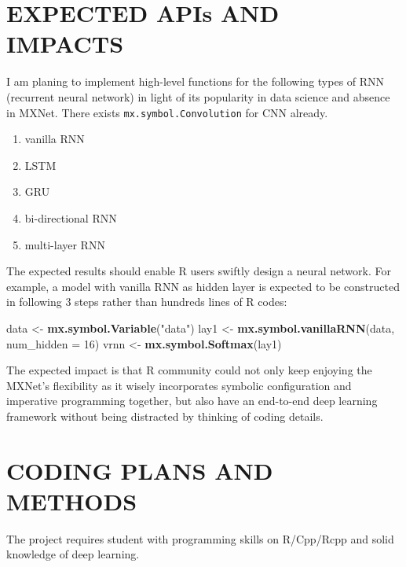\documentclass[]{article}
\newenvironment{Shaded}{\begin{snugshade}}{\end{snugshade}}
\newcommand{\KeywordTok}[1]{\textcolor[rgb]{0.13,0.29,0.53}{\textbf{{#1}}}}
\newcommand{\DataTypeTok}[1]{\textcolor[rgb]{0.13,0.29,0.53}{{#1}}}
\newcommand{\DecValTok}[1]{\textcolor[rgb]{0.00,0.00,0.81}{{#1}}}
\newcommand{\StringTok}[1]{\textcolor[rgb]{0.31,0.60,0.02}{{#1}}}
\newcommand{\NormalTok}[1]{{#1}}
\providecommand{\tightlist}{%
  \setlength{\itemsep}{0pt}\setlength{\parskip}{0pt}}
\begin{document}
\section{EXPECTED APIs AND IMPACTS}\label{expected-apis-and-impacts}

I am planing to implement high-level functions for the following types
of RNN (recurrent neural network) in light of its popularity in data
science and absence in MXNet. There exists
\texttt{mx.symbol.Convolution} for CNN already.

\begin{enumerate}
\def\labelenumi{\arabic{enumi}.}
\tightlist
\item
  vanilla RNN
\item
  LSTM
\item
  GRU
\item
  bi-directional RNN
\item
  multi-layer RNN
\end{enumerate}

The expected results should enable R users swiftly design a neural
network. For example, a model with vanilla RNN as hidden layer is
expected to be constructed in following 3 steps rather than hundreds
lines of R codes:

\begin{Shaded}
\begin{Highlighting}[]
\NormalTok{data <-}\StringTok{ }\KeywordTok{mx.symbol.Variable}\NormalTok{(}\StringTok{"data"}\NormalTok{)}
\NormalTok{lay1 <-}\StringTok{ }\KeywordTok{mx.symbol.vanillaRNN}\NormalTok{(data, }\DataTypeTok{num_hidden =} \DecValTok{16}\NormalTok{)}
\NormalTok{vrnn <-}\StringTok{ }\KeywordTok{mx.symbol.Softmax}\NormalTok{(lay1)}
\end{Highlighting}
\end{Shaded}

The expected impact is that R community could not only keep enjoying the
MXNet's flexibility as it wisely incorporates symbolic configuration and
imperative programming together, but also have an end-to-end deep
learning framework without being distracted by thinking of coding
details.

\section{CODING PLANS AND METHODS}\label{coding-plans-and-methods}

The project requires student with programming skills on R/Cpp/Rcpp and
solid knowledge of deep learning.
\end{document}
